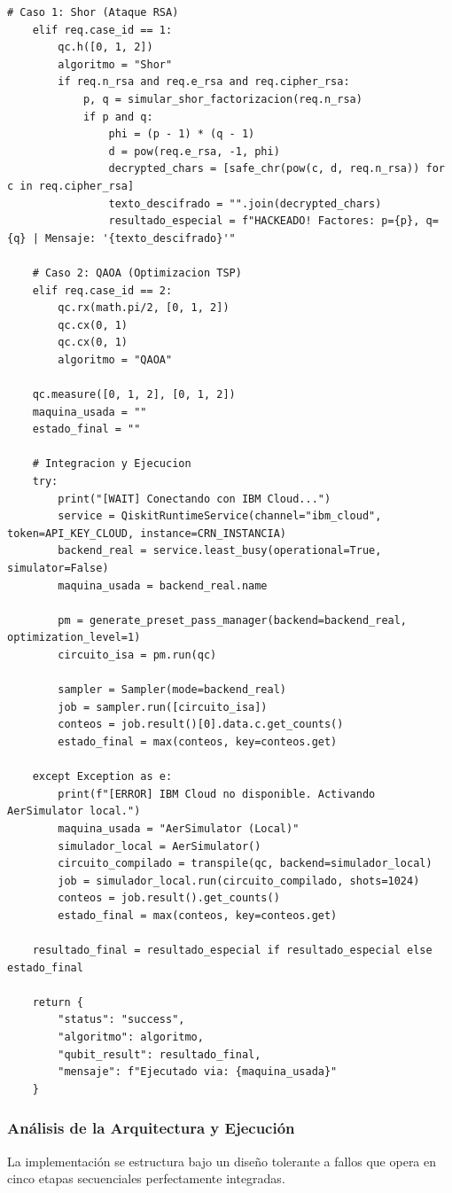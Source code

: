 \documentclass[12pt,a4paper]{article}
\begin{document}
\begin{lstlisting}[caption={Orquestador API Cuántico con Qiskit Runtime}]
    # Caso 1: Shor (Ataque RSA)
    elif req.case_id == 1:
        qc.h([0, 1, 2]) 
        algoritmo = "Shor"
        if req.n_rsa and req.e_rsa and req.cipher_rsa:
            p, q = simular_shor_factorizacion(req.n_rsa)
            if p and q:
                phi = (p - 1) * (q - 1)
                d = pow(req.e_rsa, -1, phi) 
                decrypted_chars = [safe_chr(pow(c, d, req.n_rsa)) for c in req.cipher_rsa]
                texto_descifrado = "".join(decrypted_chars)
                resultado_especial = f"HACKEADO! Factores: p={p}, q={q} | Mensaje: '{texto_descifrado}'"

    # Caso 2: QAOA (Optimizacion TSP)
    elif req.case_id == 2:
        qc.rx(math.pi/2, [0, 1, 2])
        qc.cx(0, 1)
        qc.cx(0, 1)
        algoritmo = "QAOA"

    qc.measure([0, 1, 2], [0, 1, 2])
    maquina_usada = ""
    estado_final = ""

    # Integracion y Ejecucion
    try:
        print("[WAIT] Conectando con IBM Cloud...")
        service = QiskitRuntimeService(channel="ibm_cloud", token=API_KEY_CLOUD, instance=CRN_INSTANCIA)
        backend_real = service.least_busy(operational=True, simulator=False)
        maquina_usada = backend_real.name
        
        pm = generate_preset_pass_manager(backend=backend_real, optimization_level=1)
        circuito_isa = pm.run(qc)
        
        sampler = Sampler(mode=backend_real)
        job = sampler.run([circuito_isa])
        conteos = job.result()[0].data.c.get_counts()
        estado_final = max(conteos, key=conteos.get)

    except Exception as e:
        print(f"[ERROR] IBM Cloud no disponible. Activando AerSimulator local.")
        maquina_usada = "AerSimulator (Local)"
        simulador_local = AerSimulator()
        circuito_compilado = transpile(qc, backend=simulador_local)
        job = simulador_local.run(circuito_compilado, shots=1024)
        conteos = job.result().get_counts()
        estado_final = max(conteos, key=conteos.get)

    resultado_final = resultado_especial if resultado_especial else estado_final
    
    return {
        "status": "success",
        "algoritmo": algoritmo,
        "qubit_result": resultado_final,
        "mensaje": f"Ejecutado via: {maquina_usada}"
    }
\end{lstlisting}

\subsubsection{Análisis de la Arquitectura y Ejecución}
La implementación se estructura bajo un diseño tolerante a fallos que opera en cinco etapas secuenciales perfectamente integradas. 
\end{document}

